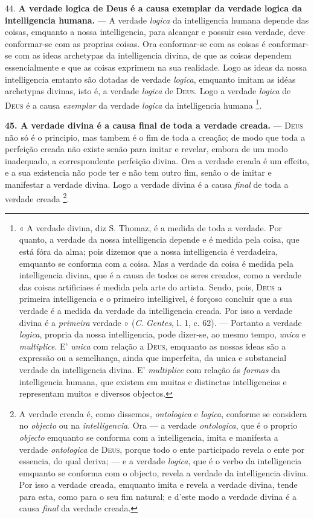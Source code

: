 44. \textbf{A verdade logica de Deus é a causa exemplar da verdade logica da intelligencia humana.} --- A verdade \emph{logica} da intelligencia humana depende das coisas, emquanto a nossa intelligencia, para alcançar e possuir essa verdade, deve conformar-se com as proprias coisas. Ora conformar-se com as coisas é conformar-se com as ideas archetypas da intelligencia divina, de que as coisas dependem essencialmente e que as coisas exprimem na sua realidade. Logo as ideas da nossa intelligencia emtanto   são dotadas de verdade \emph{logica}, emquanto imitam as idéas archetypas divinas, isto é, a verdade \emph{logica} de \textsc{Deus}. Logo a verdade \emph{logica} de \textsc{Deus} é a causa \emph{exemplar} da verdade \emph{logica} da intelligencia humana \footnote{« A verdade divina, diz S. Thomaz, é a medida de toda a verdade. Por quanto, a verdade da nossa intelligencia depende e é medida pela coisa, que está fóra da alma; pois dizemos que a nossa intelligencia é verdadeira, emquanto se conforma com a coisa. Mas a verdade da coisa é medida pela intelligencia divina, que é a causa de todos os seres creados, como a verdade das coisas artificiaes é medida pela arte do artista. Sendo, pois, \textsc{Deus} a primeira intelligencia e o primeiro intelligivel, é forçoso concluir que a sua verdade é a medida da verdade da intelligencia creada. Por isso a verdade divina é a \emph{primeira} verdade » (\emph{C}. \emph{Gentes}, l. 1, c. 62). --- Portanto a verdade \emph{logica}, propria da nossa intelligencia, pode dizer-se, ao mesmo tempo, \emph{unica} e \emph{multiplice}. E' \emph{unica} com relação a \textsc{Deus}, emquanto as nossas ideas são a expressão ou a semelhança, ainda que imperfeita, da unica e substancial verdade da intelligencia divina. E' \emph{multiplice} com relação ás \emph{formas} da intelligencia humana, que existem em muitas e distinctas intelligencias e representam muitos e diversos objectos.}.

\textbf{45. A verdade divina é a causa final de toda a verdade creada.} --- \textsc{Deus} não só é o principio, mas tambem é o fim de toda a creação; de modo que toda a perfeição creada não existe senão para imitar e revelar, embora de um modo inadequado, a correspondente perfeição divina. Ora a verdade creada é um effeito, e a sua existencia não pode ter e não tem outro fim, senão o de imitar e manifestar a verdade divina. Logo a verdade divina é a causa \emph{final} de toda a verdade creada \footnote{A verdade creada é, como dissemos, \emph{ontologica} e \emph{logica}, conforme se considera no \emph{objecto} ou na \emph{intelligencia}. Ora --- a verdade \emph{ontologica}, que é o proprio \emph{objecto} emquanto se conforma com a intelligencia, imita e manifesta a verdade \emph{ontologica} de \textsc{Deus}, porque todo o ente participado revela o ente por essencia, do qual deriva; --- e a verdade \emph{logica}, que é o verbo da intelligencia emquanto se conforma com o objecto, revela a verdade da intelligencia divina. Por isso a verdade creada, emquanto imita e revela a verdade divina, tende para esta, como para o seu fim natural; e d'este modo a verdade divina é a causa \emph{final} da verdade creada.}.

